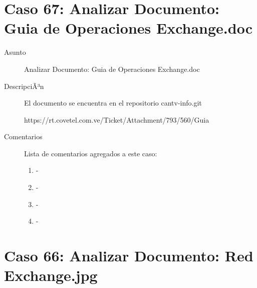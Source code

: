 \section{Caso 67: Analizar Documento: Guia de Operaciones Exchange.doc }

\begin{description}

\item[Asunto] Analizar Documento: Guia de Operaciones Exchange.doc\item[DescripciÃ³n] El documento se encuentra en el repositorio cantv-info.git

https://rt.covetel.com.ve/Ticket/Attachment/793/560/Guia%

\item[Comentarios] Lista de comentarios agregados a este caso:  
\begin{enumerate}
        \item {\bfseries  } - {\bfseries } \\         \item {\bfseries  } - {\bfseries } \\         \item {\bfseries  } - {\bfseries } \\         \item {\bfseries  } - {\bfseries } \\     \end{enumerate}

\end{description}

\section{Caso 66: Analizar Documento: Red Exchange.jpg }

